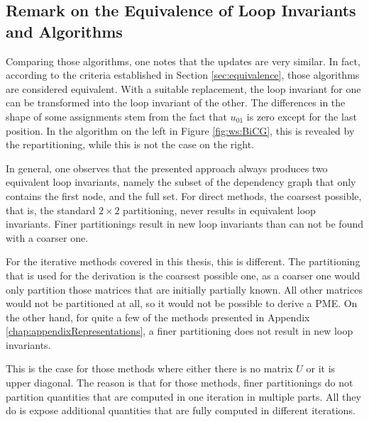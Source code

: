\subsection{Remark on the Equivalence of Loop Invariants and Algorithms}
\label{sec:RemarkEquivalence}

Comparing those algorithms, one notes that the updates are very similar. In fact, according to the criteria established in Section \ref{sec:equivalence}, those algorithms are considered equivalent. With a suitable replacement, the loop invariant for one can be transformed into the loop invariant of the other. The differences in the shape of some assignments stem from the fact that $u_{01}$ is zero except for the last position. In the algorithm on the left in Figure \ref{fig:ws:BiCG}, this is revealed by the repartitioning, while this is not the case on the right.

In general, one observes that the presented approach always produces two equivalent loop invariants, namely the subset of the dependency graph that only contains the first node, and the full set. For direct methods, the coarsest possible, that is, the standard $2 \times 2$ partitioning, never results in equivalent loop invariants. Finer partitionings result in new loop invariants than can not be found with a coarser one.

For the iterative methods covered in this thesis, this is different. The partitioning that is used for the derivation is the coarsest possible one, as a coarser one would only partition those matrices that are initially partially known. All other matrices would not be partitioned at all, so it would not be possible to derive a PME. On the other hand, for quite a few of the methods presented in Appendix \ref{chap:appendixRepresentations}, a finer partitioning does not result in new loop invariants.

This is the case for those methods where either there is no matrix $U$ or it is upper diagonal. The reason is that for those methods, finer partitionings do not partition quantities that are computed in one iteration in multiple parts. All they do is expose additional quantities that are fully computed in different iterations.

